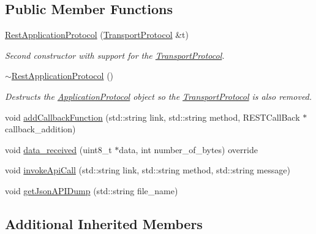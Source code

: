 \subsection*{Public Member Functions}
\begin{DoxyCompactItemize}
\item 
\hypertarget{class_rest_application_protocol_a6642fe64e3448d1e524239ab87ff9cfd}{}\hyperlink{class_rest_application_protocol_a6642fe64e3448d1e524239ab87ff9cfd}{Rest\+Application\+Protocol} (\hyperlink{class_transport_protocol}{Transport\+Protocol} \&t)\label{class_rest_application_protocol_a6642fe64e3448d1e524239ab87ff9cfd}

\begin{DoxyCompactList}\small\item\em Second constructor with support for the \hyperlink{class_transport_protocol}{Transport\+Protocol}. \end{DoxyCompactList}\item 
\hypertarget{class_rest_application_protocol_a869529fb061e565fedfe556bc0b13962}{}\hyperlink{class_rest_application_protocol_a869529fb061e565fedfe556bc0b13962}{$\sim$\+Rest\+Application\+Protocol} ()\label{class_rest_application_protocol_a869529fb061e565fedfe556bc0b13962}

\begin{DoxyCompactList}\small\item\em Destructs the \hyperlink{class_application_protocol}{Application\+Protocol} object so the \hyperlink{class_transport_protocol}{Transport\+Protocol} is also removed. \end{DoxyCompactList}\item 
void \hyperlink{class_rest_application_protocol_a1df053880d539be48c83693739bb033e}{add\+Callback\+Function} (std\+::string link, std\+::string method, R\+E\+S\+T\+Call\+Back $\ast$callback\+\_\+addition)
\item 
void \hyperlink{class_rest_application_protocol_a79abf85e9dc1b650ab059735237fde8e}{data\+\_\+received} (uint8\+\_\+t $\ast$data, int number\+\_\+of\+\_\+bytes) override
\item 
void \hyperlink{class_rest_application_protocol_aef36c940842a56d6e8ca520f3c648852}{invoke\+Api\+Call} (std\+::string link, std\+::string method, std\+::string message)
\item 
void \hyperlink{class_rest_application_protocol_a4a979770d89ba354d8321c2d4c751e05}{get\+Json\+A\+P\+I\+Dump} (std\+::string file\+\_\+name)
\end{DoxyCompactItemize}
\subsection*{Additional Inherited Members}


